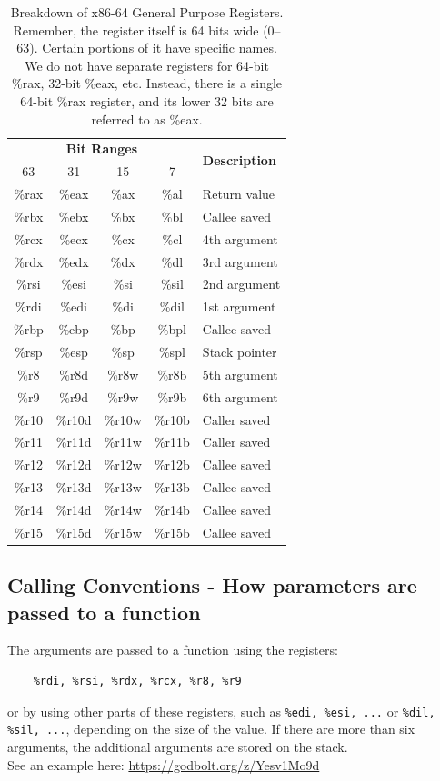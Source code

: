 \documentclass{article}
\begin{document}
\begin{table}[h]
    \centering
    \begin{tabular}{|c|c|c|c|l|}
        \hline
        \multicolumn{4}{|c|}{\textbf{Bit Ranges}} & \multirow{2}{*}{\textbf{Description}} \\
        \cline{1-4}
        63 & 31 & 15 & 7 &  \\
        \hline
        \%rax  & \%eax  & \%ax  & \%al  & Return value \\
        \%rbx  & \%ebx  & \%bx  & \%bl  & Callee saved \\
        \%rcx  & \%ecx  & \%cx  & \%cl  & 4th argument \\
        \%rdx  & \%edx  & \%dx  & \%dl  & 3rd argument \\
        \%rsi  & \%esi  & \%si  & \%sil & 2nd argument \\
        \%rdi  & \%edi  & \%di  & \%dil & 1st argument \\
        \%rbp  & \%ebp  & \%bp  & \%bpl & Callee saved \\
        \%rsp  & \%esp  & \%sp  & \%spl & Stack pointer \\
        \%r8   & \%r8d  & \%r8w  & \%r8b  & 5th argument \\
        \%r9   & \%r9d  & \%r9w  & \%r9b  & 6th argument \\
        \%r10  & \%r10d & \%r10w & \%r10b & Caller saved \\
        \%r11  & \%r11d & \%r11w & \%r11b & Caller saved \\
        \%r12  & \%r12d & \%r12w & \%r12b & Callee saved \\
        \%r13  & \%r13d & \%r13w & \%r13b & Callee saved \\
        \%r14  & \%r14d & \%r14w & \%r14b & Callee saved \\
        \%r15  & \%r15d & \%r15w & \%r15b & Callee saved \\
        \hline
    \end{tabular}
    \caption{Breakdown of x86-64 General Purpose Registers. Remember, the register itself is 64 bits wide (0–63). Certain portions of it have specific names. We do not have separate registers for 64-bit \%rax, 32-bit \%eax, etc. Instead, there is a single 64-bit \%rax register, and its lower 32 bits are referred to as \%eax.}
    \label{tab:x86_64_registers}
\end{table}
\clearpage
\subsection{Calling Conventions - How parameters are passed to a function}
\label{sec: how-args-passed}
The arguments are passed to a function using the registers:
\begin{verbatim}
    %rdi, %rsi, %rdx, %rcx, %r8, %r9
\end{verbatim}
or by using other parts of these registers, such as \texttt{\%edi, \%esi, ...} or \texttt{\%dil, \%sil, ...}, depending on the size of the value. If there are more than six arguments, the additional arguments are stored on the stack. \\
See an example here: \url{https://godbolt.org/z/Yesv1Mo9d} \\
\end{document}
